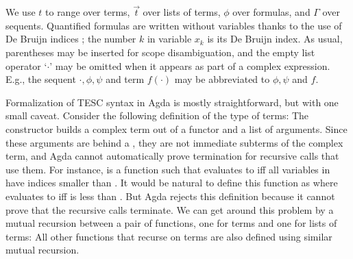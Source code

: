 \documentclass[12pt]{article}
\begin{document}
We use $t$ to range over terms, $\vec{t}$ over lists of terms, $\phi$ over formulas, 
and $\Gamma$ over sequents. Quantified formulas are written without variables thanks 
to the use of De Bruijn indices \cite{de1972lambda}; the number $k$ in variable $x_k$ is its De Bruijn index. 
As usual, parentheses may be inserted for scope disambiguation, and the empty list operator 
`$\cdot$' may be omitted when it appears as part of a complex expression. E.g., the sequent 
$\cdot, \phi, \psi$ and term $f(\cdot)$ may be abbreviated to $\phi, \psi$ and $f$.

Formalization of TESC syntax in Agda is mostly straightforward, but with one
small caveat. Consider the following definition of the type of terms:
The constructor  builds a complex term out of a 
functor and a list of arguments. Since these arguments are behind a ,
they are not immediate subterms of the complex term, and Agda cannot automatically 
prove termination for recursive calls that use them. For instance, 
 \AgdaSymbol{:} 
    is 
a function such that    
evaluates to  iff all variables in  
have indices smaller than . It would be natural to define this
function as 
where    evaluates to 
 iff  is less than .
But Agda rejects this definition because it cannot prove that the recursive 
calls terminate. We can get around this problem by a mutual recursion 
between a pair of functions, one for terms and one for lists of terms: 
All other functions that recurse on terms are also defined using similar
mutual recursion.


\end{document}
